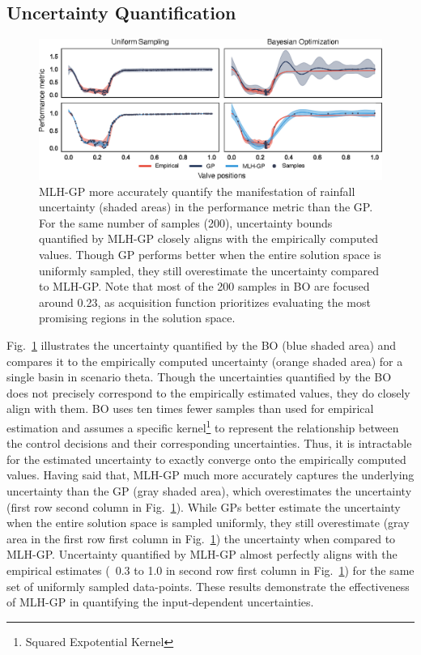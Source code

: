 \subsection{Uncertainty Quantification}

\begin{figure}[ht]
	\includegraphics[width=\linewidth]{gfx/Chapter-4/ucq.eps}
	\caption{MLH-GP more accurately quantify the manifestation of rainfall uncertainty (shaded areas) in the performance metric than the GP. 
	For the same number of samples (200), uncertainty bounds quantified by MLH-GP closely aligns with the empirically computed values.
	Though GP performs better when the entire solution space is uniformly sampled, they still overestimate the uncertainty compared to MLH-GP.
	Note that most of the 200 samples in BO are focused around 0.23, as acquisition function prioritizes evaluating the most promising regions in the solution space.}\label{fig:uc-limits}
\end{figure}

Fig.~\ref{fig:uc-limits} illustrates the uncertainty quantified by the BO (blue shaded area) and compares it to the empirically computed uncertainty (orange shaded area) for a single basin in scenario theta.
Though the uncertainties quantified by the BO does not precisely correspond to the empirically estimated values, they do closely align with them.
BO uses ten times fewer samples than used for empirical estimation and assumes a specific kernel\footnote{Squared Expotential Kernel} to represent the relationship between the control decisions and their corresponding uncertainties.
Thus, it is intractable for the estimated uncertainty to exactly converge onto the empirically computed values.
Having said that, MLH-GP much more accurately captures the underlying uncertainty than the GP (gray shaded area), which overestimates the uncertainty  (first row second column in Fig.~\ref{fig:uc-limits}).
While GPs better estimate the uncertainty when the entire solution space is sampled uniformly, they still overestimate (gray area in the first row first column in Fig.~\ref{fig:uc-limits}) the uncertainty when compared to MLH-GP\@.
Uncertainty quantified by MLH-GP almost perfectly aligns with the empirical estimates (~0.3 to 1.0 in second row first column in Fig.~\ref{fig:uc-limits}) for the same set of uniformly sampled data-points.
These results demonstrate the effectiveness of MLH-GP in quantifying the input-dependent uncertainties. 

